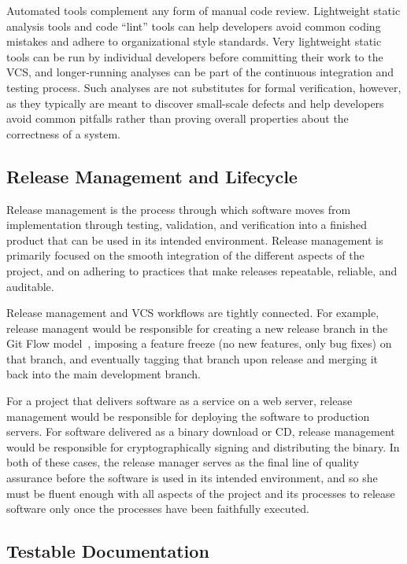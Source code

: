 Automated tools complement any form of manual code review. Lightweight
static analysis tools and code ``lint'' tools can help developers
avoid common coding mistakes and adhere to organizational style
standards. Very lightweight static tools can be run by individual
developers before committing their work to the VCS, and longer-running
analyses can be part of the continuous integration and testing
process. Such analyses are not substitutes for formal verification,
however, as they typically are meant to discover small-scale defects
and help developers avoid common pitfalls rather than proving overall
properties about the correctness of a system.

\subsection{Release Management and Lifecycle}

Release management is the process through which software moves from
implementation through testing, validation, and verification into a
finished product that can be used in its intended environment. Release
management is primarily focused on the smooth integration of the
different aspects of the project, and on adhering to practices that
make releases repeatable, reliable, and auditable.

Release management and VCS workflows are tightly connected. For
example, release managent would be responsible for creating a new
release branch in the Git Flow model~\cite{atlassianworkflow},
imposing a feature freeze (no new features, only bug fixes) on that
branch, and eventually tagging that branch upon release and merging it
back into the main development branch.

For a project that delivers software as a service on a web server,
release management would be responsible for deploying the software to
production servers. For software delivered as a binary download or CD,
release management would be responsible for cryptographically signing
and distributing the binary. In both of these cases, the release
manager serves as the final line of quality assurance before the
software is used in its intended environment, and so she must be
fluent enough with all aspects of the project and its processes to
release software only once the processes have been faithfully
executed.

\subsection{Testable Documentation}

